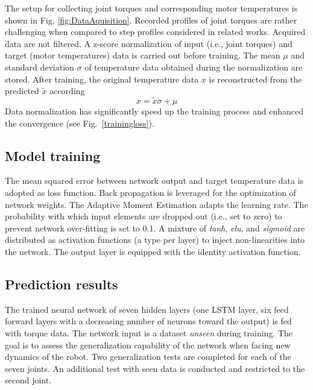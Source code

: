 \documentclass{ifacconf}
\begin{document}
The setup for collecting joint torques and corresponding motor temperatures is shown in Fig. \ref{fig:DataAquisition}. Recorded profiles of joint torques are rather challenging when compared to step profiles considered in related works.  Acquired data are not filtered. A z-score normalization of  input (i.e., joint torques) and target (motor temperatures) data is carried out before training. The  mean $\mu$ and standard deviation $\sigma$ of temperature data obtained during the normalization are stored. After training, the original temperature data $x$ is reconstructed from the predicted $\tilde{x}$ according
\begin{equation}
	x=\tilde{x}\sigma +\mu
\end{equation}
Data normalization has significantly speed up the training process and enhanced the convergence (see Fig.~\ref{trainingloss}). 
\subsection{Model training}
The mean squared error between network output and target temperature data  is adopted as loss function. Back propagation is leveraged for the optimization of network weights. The Adaptive Moment {Estimation adapts the learning rate.} The probability with which input elements are dropped out (i.e., set to zero) to prevent  network over-fitting is set to 0.1. A mixture of \textit{tanh}, \textit{elu}, and \textit{sigmoid} are distributed as activation functions (a type per layer) to inject non-linearities  into the network. The output layer is equipped {with the identity activation function.}
\subsection{Prediction results}
The trained neural network of seven hidden layers (one LSTM layer, six feed forward  layers with a decreasing number of neurons toward the output) is fed with torque data. The network input is a  dataset \textit{unseen} during training.  The goal is to  assess the generalization capability of the network when facing new dynamics of the robot. Two generalization tests are completed for each of the seven joints.  An additional test with seen data is conducted and restricted to the second joint.
\end{document}
